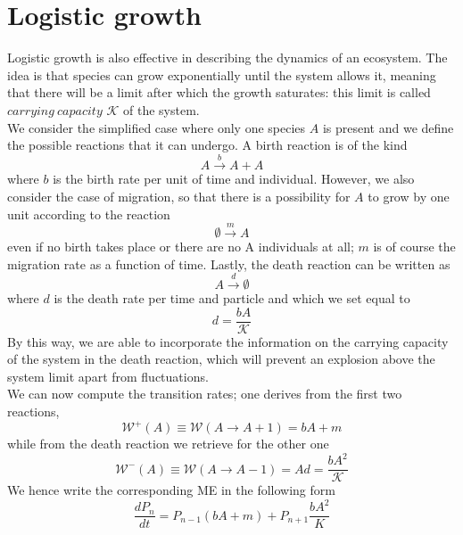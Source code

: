 \documentclass[a4paper,11pt]{article}
\begin{document}
\section{Logistic growth}
Logistic growth is also effective in describing the dynamics of an ecosystem. The idea is that species can grow exponentially until the system allows it, meaning that there will be a limit after which the growth saturates: this limit is called $carrying \ capacity$ $\mathcal{K}$ of the system.
\\
We consider the simplified case where only one species $A$ is present and we define the possible reactions that it can undergo. A birth reaction is of the kind
    \begin{equation}
         A \overset{b}{\longrightarrow} A+A
    \end{equation}
where $b$ is the birth rate per unit of time and individual. However, we also consider the case of migration, so that there is a possibility for $A$ to grow by one unit according to the reaction
\begin{equation}
    \emptyset \overset{m}{\longrightarrow} A
\end{equation}
even if no birth takes place or there are no A individuals at all; $m$ is of course the migration rate as a function of time.
Lastly, the death reaction can be written as 
\begin{equation}
    A \overset{d}{\longrightarrow} \emptyset
\end{equation}
where $d$ is the death rate per time and particle and which we set equal to 
\begin{equation}
    d = \frac{bA}{\mathcal{K}}
\end{equation}
By this way, we are able to incorporate the information on the carrying capacity of the system in the death reaction, which will prevent an explosion above the system limit apart from fluctuations.
\\
We can now compute the transition rates; one derives from the first two reactions,
    \begin{equation}
        \mathcal{W}^+(A) \equiv \mathcal{W}(A \rightarrow A+1) = bA + m
    \end{equation}
while from the death reaction we retrieve for the other one
    \begin{equation}
        \mathcal{W}^-(A) \equiv \mathcal{W}(A \rightarrow A-1) = Ad = \frac{bA^2}{\mathcal{K}}
    \end{equation}
We hence write the corresponding ME in the following form
\begin{equation}
 \frac{dP_n}{dt} = P_{n-1}(bA + m) + P_{n+1}\frac{bA^2}{K}
\end{equation}
\end{document}

